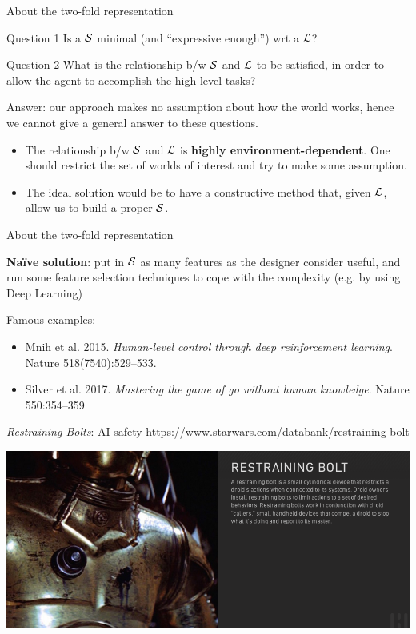 \documentclass{beamer}
\begin{document}
\begin{frame}{About the two-fold representation}
		
	\begin{block}{Question 1}
		Is a $\S$ minimal (and ``expressive enough'') wrt a $\L$?
	\end{block}
	
	\begin{block}{Question 2}
		What is the relationship b/w $\S$ and $\L$ to be satisfied, in order to allow the agent to accomplish the high-level tasks?
	\end{block}

	Answer: our approach makes no assumption about how the world works, hence we cannot give a general answer to these questions.\\
	
	\begin{itemize}
		\item The relationship b/w $\S$ and $\L$ is \textbf{highly environment-dependent}. One should restrict the set of worlds of interest and try to make some assumption.
		
		\item The ideal solution would be to have a constructive method that, given $\L$, allow us to build a proper $\S$.
	\end{itemize}

\end{frame}
\begin{frame}{About the two-fold representation}
	
	
	\textbf{Na\"ive solution}: put in $\S$ as many features as the designer consider useful, and run some feature selection techniques to cope with the complexity (e.g. by using Deep Learning)
	
	Famous examples:
	\begin{itemize}
		\item Mnih et al. 2015. \emph{Human-level control through deep reinforcement learning}. Nature 518(7540):529–533.
		\item Silver et al. 2017. \emph{Mastering the game of go without human knowledge}. Nature 550:354–359
	\end{itemize}
\end{frame}

\begin{frame}{\emph{Restraining Bolts}: AI safety}
	\url{https://www.starwars.com/databank/restraining-bolt}
	\begin{center}
	\includegraphics[width=\textwidth]{images//restraining-bolt}
	\end{center}

\end{frame}
\end{document}
